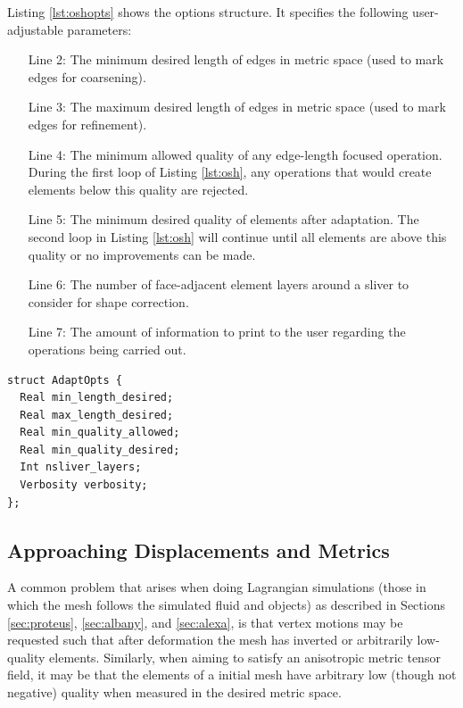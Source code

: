 Listing \ref{lst:oshopts} shows the options structure.
It specifies the following user-adjustable parameters:
\begin{enumerate}
\item[Line 2:] The minimum desired length of edges in metric space
(used to mark edges for coarsening).
\item[Line 3:] The maximum desired length of edges
in metric space (used to mark edges for refinement).
\item[Line 4:] The minimum allowed quality of any edge-length focused
operation. During the first loop of Listing \ref{lst:osh},
any operations that would create elements below this quality are rejected.
\item[Line 5:] The minimum desired quality of elements after adaptation.
The second loop in Listing \ref{lst:osh} will continue until
all elements are above this quality or no improvements can be made.
\item[Line 6:] The number of face-adjacent element layers around
a sliver to consider for shape correction.
\item[Line 7:] The amount of information to print to the user regarding
the operations being carried out.
\end{enumerate}

\begin{lstlisting}[float,style=dan-style,caption=Omega\_h parameters,label=lst:oshopts]
struct AdaptOpts {
  Real min_length_desired;
  Real max_length_desired;
  Real min_quality_allowed;
  Real min_quality_desired;
  Int nsliver_layers;
  Verbosity verbosity;
};
\end{lstlisting}

\subsection{Approaching Displacements and Metrics}
\label{sec:approach}

A common problem that arises when doing Lagrangian simulations
(those in which the mesh follows the simulated fluid and objects)
as described in Sections \ref{sec:proteus}, \ref{sec:albany}, and \ref{sec:alexa},
is that vertex motions may be requested such that after
deformation the mesh has inverted or arbitrarily low-quality elements.
Similarly, when aiming to satisfy an anisotropic metric tensor
field, it may be that the elements of a initial mesh have arbitrary low
(though not negative) quality when measured in the desired metric space.

